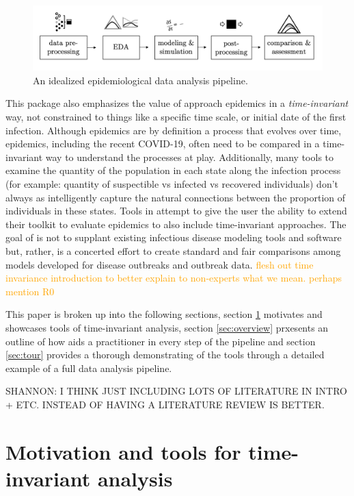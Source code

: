 \documentclass[
  shortnames]{jss}
\begin{document}
\begin{figure}[!ht]
    \centering
    \includegraphics[width = 1\textwidth]{images/pipeline1.png}
    \caption{An idealized epidemiological data analysis pipeline.}
    \label{fig:pipeline}
\end{figure}

This package also emphasizes the value of approach epidemics in a
\textit{time-invariant} way, not constrained to things like a specific
time scale, or initial date of the first infection. Although epidemics
are by definition a process that evolves over time, epidemics, including
the recent COVID-19, often need to be compared in a time-invariant way
to understand the processes at play. Additionally, many tools to examine
the quantity of the population in each state along the infection process
(for example: quantity of suspectible vs infected vs recovered
individuals) don't always as intelligently capture the natural
connections between the proportion of individuals in these states. Tools
in  attempt to give the user the ability to extend their
toolkit to evaluate epidemics to also include time-invariant approaches.
The goal of  is not to supplant existing infectious
disease modeling tools and software but, rather, is a concerted effort
to create standard and fair comparisons among models developed for
disease outbreaks and outbreak data.
\textcolor{orange}{flesh out time invariance introduction to better explain to non-experts what we mean.  perhaps mention R0}

This paper is broken up into the following sections, section
\ref{sec:time-invariant} motivates and showcases tools of time-invariant
analysis, section \ref{sec:overview} prxesents an outline of how
 aids a practitioner in every step of the pipeline and
section \ref{sec:tour} provides a thorough demonstrating of the tools
through a detailed example of a full data analysis pipeline.

SHANNON: I THINK JUST INCLUDING LOTS OF LITERATURE IN INTRO + ETC.
INSTEAD OF HAVING A LITERATURE REVIEW IS BETTER.

\section[Time-invariant]{Motivation and tools for time-invariant
analysis}\label{sec:time-invariant}
\end{document}
